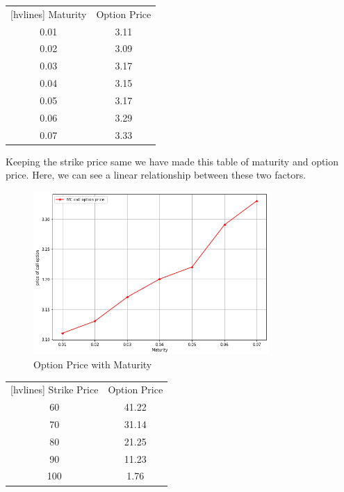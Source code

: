 \begin{center}
	\begin{NiceTabular}{|c|c|}[hvlines]
		 Maturity & Option Price\\ 
		0.01 & 3.11 \\ 
		0.02 & 3.09 \\
		0.03 & 3.17 \\
		0.04 & 3.15  \\
		0.05 & 3.17 \\
		0.06 & 3.29 \\
		0.07 & 3.33 \\
	\end{NiceTabular}
\end{center}
\noindent Keeping the strike price same we have made this table of maturity and option price. Here, we can see a linear relationship between these two factors. 
\begin{figure}[H]
	\begin{center}
		\includegraphics[width=0.8\textwidth]{MC_call_option_price}
	\end{center}
	\caption{Option Price with Maturity}
\end{figure}




\begin{center}
	\begin{NiceTabular}{|c|c|}[hvlines]
		 Strike Price & Option Price\\ 
		60 & 41.22 \\ 
		70 & 31.14 \\
		80 & 21.25 \\
		90 & 11.23  \\
		100 & 1.76 \\
	\end{NiceTabular}
\end{center}


